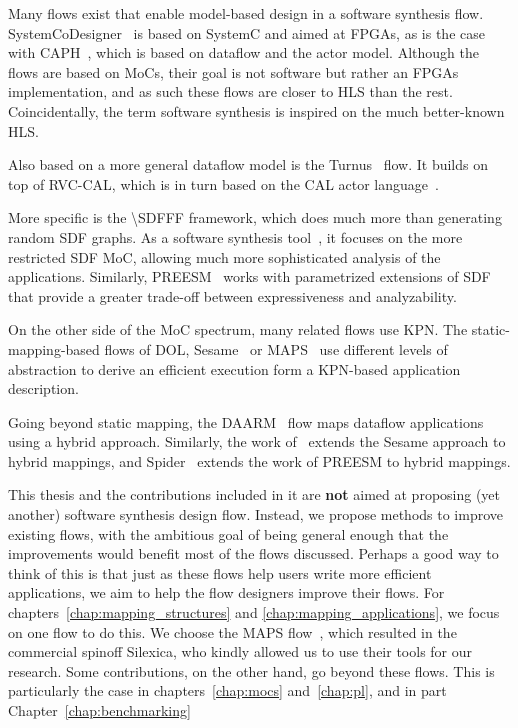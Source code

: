 Many flows exist that enable model-based design in a software synthesis flow.
SystemCoDesigner~\cite{haubelt2008systemcodesigner} is based on SystemC and aimed at \acsp{FPGA}, as is the case with CAPH~\cite{serot2013caph}, which is based on dataflow and the actor model.
Although the flows are based on \acp{MoC}, their goal is not software but rather an \acsp{FPGA} implementation, and as such these flows are closer to \ac{HLS} than the rest. 
Coincidentally, the term software synthesis is inspired on the much better-known \ac{HLS}.

Also based on a more general dataflow model is the Turnus~\cite{casale2013turnus} flow.
It builds on top of RVC-CAL, which is in turn based on the CAL actor language~\cite{cal}.

More specific is the \ac{\SDFFF}\cite{sdf3} framework, which does much more than generating random \ac{SDF} graphs.
As a software synthesis tool~\cite{stuijk2010predictable}, it focuses on the more restricted \ac{SDF} \ac{MoC}, allowing much more sophisticated analysis of the applications.
Similarly, PREESM~\cite{pelcat2014preesm} works with parametrized extensions of \ac{SDF}~\cite{desnos2013pimm} that provide a greater trade-off between expressiveness and analyzability.

On the other side of the \ac{MoC} spectrum, many related flows use \ac{KPN}.
The static-mapping-based flows of \ac{DOL}\cite{thiele2007dol}, Sesame~\cite{pimentel2006systematic} or \ac{MAPS}~\cite{maps} use different levels of abstraction to derive an efficient execution form a \ac{KPN}-based application description.

Going beyond static mapping, the DAARM~\cite{weichslgartner2014daarm} flow maps dataflow applications using a hybrid approach.
Similarly, the work of~\cite{quan2015hybrid} extends the Sesame approach to hybrid mappings, and Spider~\cite{heulot2014spider} extends the work of PREESM to hybrid mappings.

This thesis and the contributions included in it are \textbf{not} aimed at proposing (yet another) software synthesis design flow.
Instead, we propose methods to improve existing flows, with the ambitious goal of being general enough that the improvements would benefit most of the flows discussed. 
Perhaps a good way to think of this is that just as these flows help users write more efficient applications, we aim to help the flow designers improve their flows.
For chapters~\ref{chap:mapping_structures} and \ref{chap:mapping_applications}, we focus on one flow to do this.
We choose the \ac{MAPS} flow~\cite{maps}, which resulted in the commercial spinoff Silexica, who kindly allowed us to use their tools for our research.
Some contributions, on the other hand, go beyond these flows. This is particularly the case in chapters~\ref{chap:mocs} and~\ref{chap:pl}, and in part Chapter~\ref{chap:benchmarking} 

